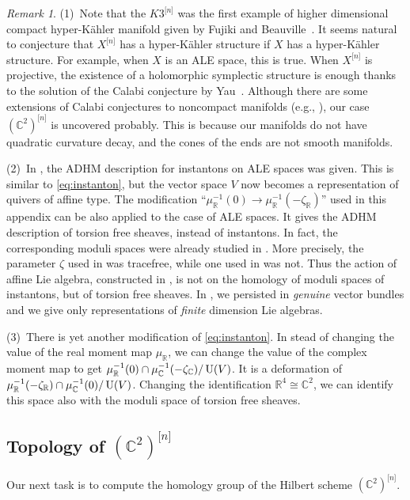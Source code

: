 \documentclass[12pt]{amsart}
\theoremstyle{definition}
\theoremstyle{remark}
\newtheorem{Remark}[equation]{Remark}
\numberwithin{equation}{section}
\newcommand{\C}{{\mathbb C}}
\newcommand{\R}{{\mathbb R}}
\newcommand{\U}{\operatorname{\rm U}}
\newcommand{\Hilb}[2]{{#1}^{\lbrack{#2}\rbrack}} %
\newcommand{\Hilbn}[1]{\Hilb{#1}{n}}
\begin{document}
\begin{Remark}
(1)\
Note that the $\Hilbn{K3}$ was the first example of higher dimensional
compact hyper-K\"ahler manifold given by Fujiki and Beauville~\cite{Be}.
It seems natural to conjecture that $\Hilbn{X}$ has a hyper-K\"ahler
structure if $X$ has a hyper-K\"ahler structure. For example,
when $X$ is an ALE space, this is true.
When $\Hilbn{X}$ is projective, the existence of a holomorphic
symplectic structure is enough thanks to the solution of the Calabi
conjecture by Yau~\cite{Yau}.
Although there are some extensions of Calabi conjectures to noncompact
manifolds (e.g., \cite{BK,TY}), our case $\Hilbn{(\C^2)}$ is uncovered
probably. This is because our manifolds do not have quadratic curvature
decay, and the cones of the ends are not smooth manifolds.

(2)\
In \cite{KN}, the ADHM description for instantons on ALE spaces was
given. This is similar to \eqref{eq:instanton}, but the vector space
$V$ now becomes a representation of quivers of affine type.
The modification ``$\mu_\R^{-1}(0) \to \mu_\R^{-1}(-\zeta_\R)$'' used
in this appendix can be also applied to the case of ALE spaces.
It gives the ADHM description of torsion free sheaves, instead of
instantons.
In fact, the corresponding moduli spaces were already studied in
\cite{Na-quiver}.
More precisely, the parameter $\zeta$ used in \cite{KN} was tracefree,
while one used in \cite{Na-quiver} was not.
Thus the action of affine Lie algebra, constructed in \cite{Na-quiver},
is not on the homology of moduli spaces of instantons, but of torsion
free sheaves.
In \cite{Na-gauge}, we persisted in {\it genuine\/} vector bundles and
we give only representations of {\it finite\/} dimension
Lie algebras.

(3)\
There is yet another modification of \eqref{eq:instanton}.
In stead of changing the value of the real moment map $\mu_\R$, we can
change the value of the complex moment map to get
$\mu_\R^{-1}(0)\cap\mu_\C^{-1}(-\zeta_\C)/\U(V)$.
It is a deformation of $\mu_\R^{-1}(-\zeta_\R)\cap\mu_\C^{-1}(0)/\U(V)$.
Changing the identification $\R^4 \cong \C^2$, we can identify
this space also with the moduli space of torsion free sheaves.
\label{sheaf}\end{Remark}
%
\subsection{Topology of $\Hilbn{(\C^2)}$}
%
Our next task is to compute the homology group of the Hilbert scheme
$\Hilbn{(\C^2)}$.
\end{document}
